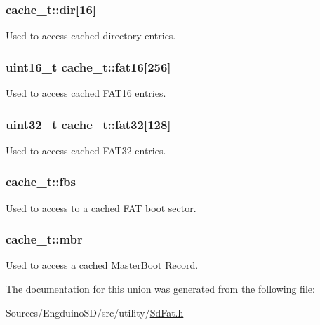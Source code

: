 \subsubsection[{dir}]{ cache\+\_\+t\+::dir\mbox{[}16\mbox{]}}\label{unioncache__t_a7396fdbdb7c52bd1d72c5329ff32acd1}
Used to access cached directory entries. \hypertarget{unioncache__t_a8f3a4e9392a7d8ace954fc44c57df887}{}
\subsubsection[{fat16}]{\setlength{\rightskip}{0pt plus 5cm}uint16\+\_\+t cache\+\_\+t\+::fat16\mbox{[}256\mbox{]}}\label{unioncache__t_a8f3a4e9392a7d8ace954fc44c57df887}
Used to access cached F\+A\+T16 entries. \hypertarget{unioncache__t_a57e16421bf460d1ba6cb9ce9a23a4a83}{}
\subsubsection[{fat32}]{\setlength{\rightskip}{0pt plus 5cm}uint32\+\_\+t cache\+\_\+t\+::fat32\mbox{[}128\mbox{]}}\label{unioncache__t_a57e16421bf460d1ba6cb9ce9a23a4a83}
Used to access cached F\+A\+T32 entries. \hypertarget{unioncache__t_a0691515e5d969f98c4285bfe0c16a309}{}
\subsubsection[{fbs}]{ cache\+\_\+t\+::fbs}\label{unioncache__t_a0691515e5d969f98c4285bfe0c16a309}
Used to access to a cached F\+A\+T boot sector. \hypertarget{unioncache__t_a6ac10bfb1ebb1139c448456679663bb6}{}
\subsubsection[{mbr}]{ cache\+\_\+t\+::mbr}\label{unioncache__t_a6ac10bfb1ebb1139c448456679663bb6}
Used to access a cached Master\+Boot Record. 

The documentation for this union was generated from the following file\+:\begin{DoxyCompactItemize}
\item 
Sources/\+Engduino\+S\+D/src/utility/\hyperlink{_sd_fat_8h}{Sd\+Fat.\+h}\end{DoxyCompactItemize}
